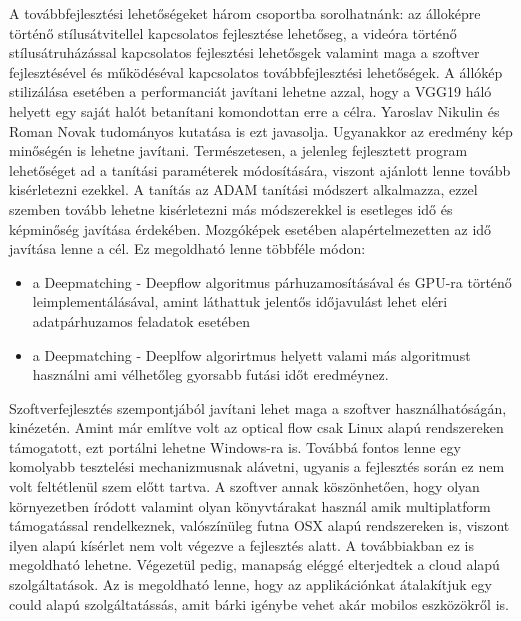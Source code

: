 \documentclass[12pt, a4paper, oneside]{book}
\theoremstyle{tetel}
\begin{document}
A továbbfejlesztési lehetőségeket három csoportba sorolhatnánk: az álloképre történő stílusátvitellel kapcsolatos fejlesztése lehetőseg, a videóra történő stílusátruházással kapcsolatos fejlesztési lehetősgek valamint maga a szoftver fejlesztésével és működéséval kapcsolatos továbbfejlesztési lehetőségek.
\newline
\indent
A állókép stilizálása esetében a performanciát javítani lehetne azzal, hogy a VGG19 háló helyett egy saját halót betanítani komondottan erre a célra. Yaroslav Nikulin és Roman Novak tudományos kutatása\cite{16} is ezt javasolja. Ugyanakkor az eredmény kép minőségén is lehetne javítani. Természetesen, a jelenleg fejlesztett program lehetőséget ad a tanítási paraméterek módosítására, viszont ajánlott lenne tovább kisérletezni ezekkel. A tanítás az ADAM tanítási módszert alkalmazza, ezzel szemben tovább lehetne kisérletezni más módszerekkel is esetleges idő és képminőség javítása érdekében.
\newline
\indent
Mozgóképek esetében alapértelmezetten az idő javítása lenne a cél. Ez megoldható lenne többféle módon:
\begin{itemize}
	\item a Deepmatching - Deepflow algoritmus párhuzamosításával és GPU-ra történő leimplementálásával, amint láthattuk jelentős időjavulást lehet eléri adatpárhuzamos feladatok esetében
	\item a Deepmatching - Deeplfow algorirtmus helyett valami más algoritmust használni ami vélhetőleg gyorsabb futási időt eredméynez.
\end{itemize}

Szoftverfejlesztés szempontjából javítani lehet maga a szoftver használhatóságán, kinézetén. Amint már említve volt az optical flow csak Linux alapú rendszereken támogatott, ezt portálni lehetne Windows-ra is. Továbbá fontos lenne egy komolyabb tesztelési mechanizmusnak alávetni, ugyanis a fejlesztés során ez nem volt feltétlenül szem előtt tartva.
\newline
\indent
A szoftver annak köszönhetően, hogy olyan környezetben íródott valamint olyan könyvtárakat használ amik multiplatform támogatással rendelkeznek, valószínüleg futna OSX alapú rendszereken is, viszont ilyen alapú kísérlet nem volt végezve a fejlesztés alatt. A továbbiakban ez is megoldható lehetne. 
\newline
\indent
Végezetül pedig, manapság eléggé elterjedtek a cloud alapú szolgáltatások. Az is megoldható lenne, hogy az applikációnkat átalakítjuk egy could alapú szolgáltatássás, amit bárki igénybe vehet akár mobilos eszközökről is.
\end{document}
